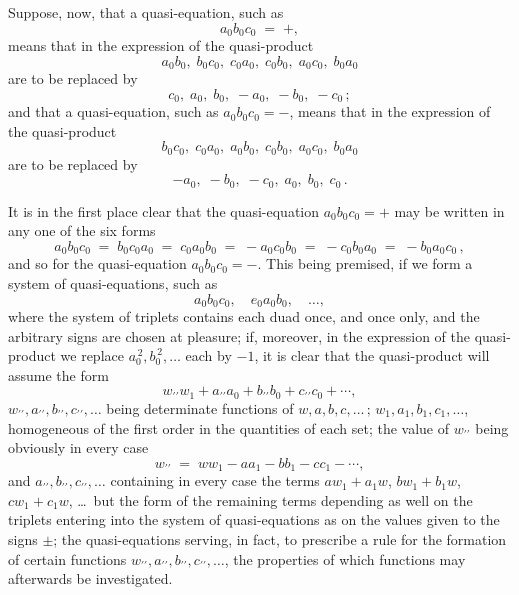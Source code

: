 \documentclass[11pt]{article}
\begin{document}
Suppose, now, that a quasi-equation, such as
\[
a_{0} b_{0} c_{0} \;=\; +,
\]
means that in the expression of the quasi-product
\[
a_{0} b_{0},\; b_{0} c_{0},\; c_{0} a_{0},\; c_{0} b_{0},\; a_{0} c_{0},\; b_{0} a_{0}
\]
are to be replaced by
\[
c_{0},\; a_{0},\; b_{0},\; -a_{0},\; -b_{0},\; -c_{0}\,;
\]
and that a quasi-equation, such as $a_{0} b_{0} c_{0} = -$, means that in the expression of the quasi-product
\[
b_{0} c_{0},\; c_{0} a_{0},\; a_{0} b_{0},\; c_{0} b_{0},\; a_{0} c_{0},\; b_{0} a_{0}
\]
are to be replaced by
\[
-a_{0},\; -b_{0},\; -c_{0},\; a_{0},\; b_{0},\; c_{0}\,.
\]

It is in the first place clear that the quasi-equation $a_{0} b_{0} c_{0} = +$ may be written in any one of the six forms
\[
a_{0} b_{0} c_{0} \;=\; b_{0} c_{0} a_{0} \;=\; c_{0} a_{0} b_{0} \;=\; -a_{0} c_{0} b_{0} \;=\; -c_{0} b_{0} a_{0} \;=\; -b_{0} a_{0} c_{0}\,,
\]
and so for the quasi-equation $a_{0} b_{0} c_{0} = -$. This being premised, if we form a system of quasi-equations, such as
\[
a_{0} b_{0} c_{0},\quad e_{0} a_{0} b_{0},\quad \ldots,
\]
where the system of triplets contains each duad once, and once only, and the arbitrary signs are chosen at pleasure; if, moreover, in the expression of the quasi-product we replace $a_{0}^{\,2}, b_{0}^{\,2}, \ldots$ each by $-1$, it is clear that the quasi-product will assume the form
\[
w_{\prime\prime} w_{1} + a_{\prime\prime} a_{0} + b_{\prime\prime} b_{0} + c_{\prime\prime} c_{0} + \cdots,
\]
$w_{\prime\prime}, a_{\prime\prime}, b_{\prime\prime}, c_{\prime\prime}, \ldots$ being determinate functions of $w, a, b, c, \ldots\,;\, w_{1}, a_{1}, b_{1}, c_{1}, \ldots$, homogeneous of the first order in the quantities of each set; the value of $w_{\prime\prime}$ being obviously in every case
\[
w_{\prime\prime} \;=\; w w_{1} - a a_{1} - b b_{1} - c c_{1} - \cdots,
\]
and $a_{\prime\prime}, b_{\prime\prime}, c_{\prime\prime}, \ldots$ containing in every case the terms $a w_{1} + a_{1} w$, $b w_{1} + b_{1} w$, $c w_{1} + c_{1} w$, \ldots\ but the form of the remaining terms depending as well on the triplets entering into the system of quasi-equations as on the values given to the signs $\pm$; the quasi-equations serving, in fact, to prescribe a rule for the formation of certain functions $w_{\prime\prime}, a_{\prime\prime}, b_{\prime\prime}, c_{\prime\prime}, \ldots$, the properties of which functions may afterwards be investigated.
\end{document}

